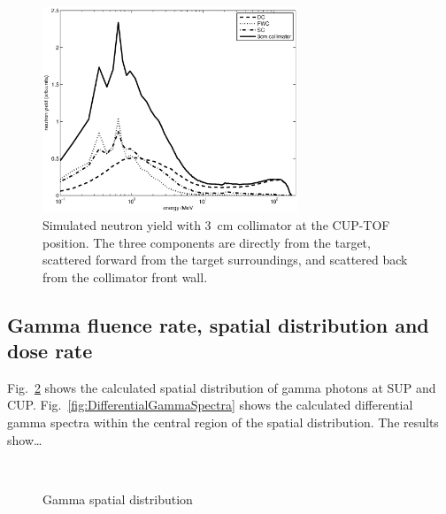 \documentclass[12pt,journal]{IEEEtran}
\let\MYoriglatexcaption\caption
\renewcommand{\caption}[2][\relax]{\MYoriglatexcaption[#2]{#2}}
\begin{document}
\begin{figure}[!t]
	\centering
	\includegraphics[width=3in]{TOF3Componentslinear.eps}
	\caption{
    Simulated neutron yield with \SI{3}{\cm} collimator at the CUP-TOF position.
    The three components are directly from the target, scattered forward from the target surroundings, and scattered back from the collimator front wall.}
	\label{fig:TOF3Componentslinear}
\end{figure}

\subsection{Gamma fluence rate, spatial distribution and dose rate}

Fig.~\ref{fig:GammaSpatialDistribution} shows the calculated spatial distribution of gamma photons at SUP and CUP.
Fig.~\ref{fig:DifferentialGammaSpectra} shows the calculated differential gamma spectra within the central region of the spatial distribution.
The results show\ldots{}

\begin{figure}
    \centering
    \vspace{2in}
    \\
    \caption{Gamma spatial distribution}
    \label{fig:GammaSpatialDistribution}
\end{figure}
\end{document}
